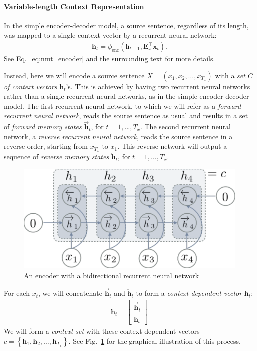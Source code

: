 \documentclass{report}
\newcommand{\vect}[1]{\mathbf{#1}}
\newcommand{\matr}[1]{\mathbf{#1}}
\newcommand{\vh}[0]{\vect{h}}
\newcommand{\vx}[0]{\vect{x}}
\newcommand{\mE}[0]{\matr{E}}
\newcommand{\enc}{\text{enc}}
\begin{document}
\paragraph{Variable-length Context Representation}

In the simple encoder-decoder model, a source sentence, regardless of its
length, was mapped to a single context vector by a recurrent neural network:
\begin{align*}
    \vh_t = \phi_{\enc}\left( \vh_{t-1}, \mE_x^\top \vx_t \right).
\end{align*}
See Eq.~\eqref{eq:nmt_encoder} and the surrounding text for more details.

Instead, here we will encode a source sentence $X=(x_1, x_2, \ldots, x_{T_x})$
with a {\em set $C$ of context vectors} $\vh_t$'s. This is achieved by having
two recurrent neural networks rather than a single recurrent neural networks, as
in the simple encoder-decoder model. The first recurrent neural network, to
which we will refer as a {\em forward recurrent neural network}, reads the
source sentence as usual and results in a set of {\em forward memory states}
$\overrightarrow{\vh}_t$, for $t=1,\ldots,T_x$. The second recurrent neural
network, a {\em reverse recurrent neural network}, reads the source sentence
in a reverse order, starting from $x_{T_x}$ to $x_1$. This reverse network will
output a sequence of {\em reverse memory states} $\overleftarrow{\vh}_t$, for
$t=1, \ldots, T_x$.

\begin{figure}[t]
    \centering
    \centering
    \includegraphics[width=0.7\columnwidth]{figures/bi_encoder.pdf}

    \caption{An encoder with a bidirectional recurrent neural network}
    \label{fig:bienc}
\end{figure}

For each $x_t$, we will concatenate $\overrightarrow{\vh}_t$ and
$\overleftarrow{\vh}_t$ to form a {\em context-dependent vector} $\vh_t$:
\begin{align*}
    \vh_t = \left[ \begin{array}{c}
            \overrightarrow{\vh}_t \\
            \overleftarrow{\vh}_t
    \end{array} \right]
\end{align*}
We will form a {\em context set} with these context-dependent vectors $c=\left\{
\vh_1, \vh_2, \ldots, \vh_{T_x}\right\}$. See Fig.~\ref{fig:bienc} for the
graphical illustration of this process.
\end{document}
